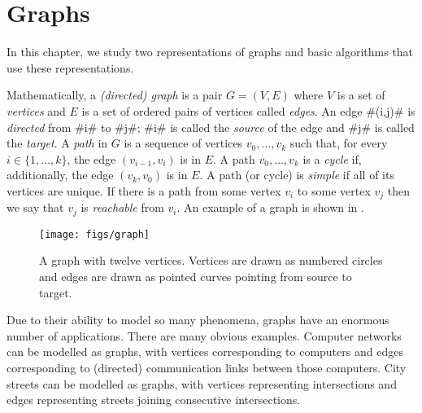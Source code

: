 \chapter{Graphs}


In this chapter, we study two representations of graphs and basic
algorithms that use these representations.  

Mathematically, a \emph{(directed) graph}
%
%
is a pair $G=(V,E)$ where
$V$ is a set of \emph{vertices}
%
and $E$ is a set of ordered pairs
of vertices called \emph{edges}.
%
An edge #(i,j)# is \emph{directed}
%
from #i# to #j#;  #i# is called the \emph{source}
 of the edge and #j#
is called the \emph{target}.
  A \emph{path}%
 in $G$ is a sequence of
vertices $v_0,\ldots,v_k$ such that, for every $i\in\{1,\ldots,k\}$,
the edge $(v_{i-1},v_{i})$ is in $E$.  A path $v_0,\ldots,v_k$ is a
\emph{cycle}
%
if, additionally, the edge $(v_k,v_0)$ is in $E$.  A path (or
cycle) is \emph{simple}
%
if all of its vertices are unique.  If there
is a path from some vertex $v_i$ to some vertex $v_j$ then we say that
$v_j$ is \emph{reachable}
 from $v_i$.  An example of a graph is shown
in .

\begin{figure}
  \begin{center}
    \texttt{[image: figs/graph]}
  \end{center}
  \caption{A graph with twelve vertices.  Vertices are drawn as numbered
    circles and edges are drawn as pointed curves pointing from source
    to target.}
\end{figure}

Due to their ability to model so many phenomena, graphs have an enormous
number of applications. There are many obvious examples. Computer
networks can be modelled as graphs, with vertices corresponding to
computers and edges corresponding to (directed) communication links
between those computers.  City streets can be modelled as graphs,
with vertices representing intersections and edges representing streets
joining consecutive intersections.

